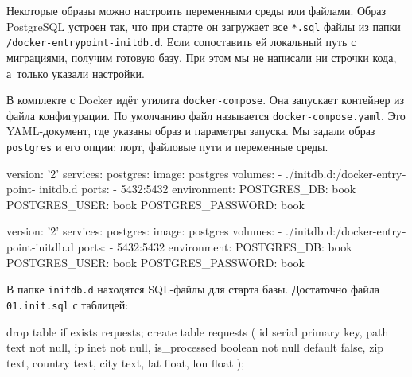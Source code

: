 \mnoindent
Некоторые образы можно настроить переменными среды или файлами. Образ PostgreSQL
устроен так, что при старте он загружает все \verb|*.sql| файлы из папки
\texttt{/docker-entrypoint\--initdb.d}. Если сопоставить ей локальный путь с
миграциями, получим готовую базу. При этом мы не написали ни строчки кода,
а~только указали настройки.


В комплекте с Docker идёт утилита \texttt{docker\--compose}. Она запускает
контейнер из файла конфигурации. По умолчанию файл называется
\verb|docker-compose.yaml|. Это YAML-документ, где указаны образ и параметры
запуска. Мы задали образ \verb|postgres| и его опции: порт, файловые пути и
переменные среды.


\ifx\DEVICETYPE\MOBILE

\begin{english}
  \begin{yaml}
version: '2'
services:
  postgres:
    image: postgres
    volumes:
      - ./initdb.d:/docker-entrypoint-
                                initdb.d
    ports:
      - 5432:5432
    environment:
      POSTGRES_DB: book
      POSTGRES_USER: book
      POSTGRES_PASSWORD: book
  \end{yaml}
\end{english}

\else

\begin{english}
  \begin{yaml}
version: '2'
services:
  postgres:
    image: postgres
    volumes:
      - ./initdb.d:/docker-entrypoint-initdb.d
    ports:
      - 5432:5432
    environment:
      POSTGRES_DB: book
      POSTGRES_USER: book
      POSTGRES_PASSWORD: book
  \end{yaml}
\end{english}

\fi

\mnoindent
В папке \verb|initdb.d| находятся SQL-файлы для старта базы. Достаточно файла
\verb|01.init.sql| с таблицей:


\ifx\DEVICETYPE\MOBILE

\begin{english}
  \begin{sql}
drop table if exists requests;
create table requests (
    id            serial primary key,
    path          text not null,
    ip            inet not null,
    is_processed  boolean not null
                  default false,
    zip           text,
    country       text,
    city          text,
    lat           float,
    lon           float
);
  \end{sql}
\end{english}

